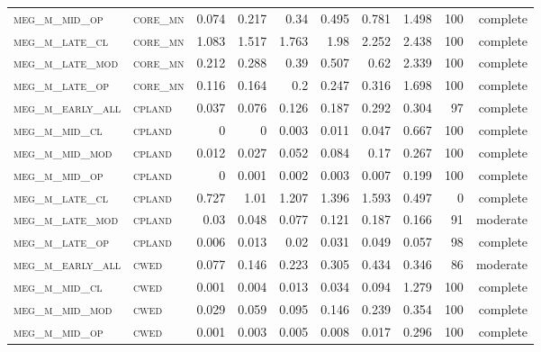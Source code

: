 \begin{landscape}
\begin{center}
\begin{footnotesize}
\begin{longtable}{llrrrrr|rrr}
\textsc{meg\_m\_mid\_op   } & \textsc{core\_mn  }   & 0.074    & 0.217    & 0.34     & 0.495    & 0.781    & 1.498    & 100 & complete \\
\textsc{meg\_m\_late\_cl  } & \textsc{core\_mn  }   & 1.083    & 1.517    & 1.763    & 1.98     & 2.252    & 2.438    & 100 & complete \\
\textsc{meg\_m\_late\_mod } & \textsc{core\_mn  }   & 0.212    & 0.288    & 0.39     & 0.507    & 0.62     & 2.339    & 100 & complete \\
\textsc{meg\_m\_late\_op  } & \textsc{core\_mn  }   & 0.116    & 0.164    & 0.2      & 0.247    & 0.316    & 1.698    & 100 & complete \\
\textsc{meg\_m\_early\_all} & \textsc{cpland    }   & 0.037    & 0.076    & 0.126    & 0.187    & 0.292    & 0.304    & 97  & complete \\
\textsc{meg\_m\_mid\_cl   } & \textsc{cpland    }   & 0        & 0        & 0.003    & 0.011    & 0.047    & 0.667    & 100 & complete \\
\textsc{meg\_m\_mid\_mod  } & \textsc{cpland    }   & 0.012    & 0.027    & 0.052    & 0.084    & 0.17     & 0.267    & 100 & complete \\
\textsc{meg\_m\_mid\_op   } & \textsc{cpland    }   & 0        & 0.001    & 0.002    & 0.003    & 0.007    & 0.199    & 100 & complete \\
\textsc{meg\_m\_late\_cl  } & \textsc{cpland    }   & 0.727    & 1.01     & 1.207    & 1.396    & 1.593    & 0.497    & 0   & complete \\
\textsc{meg\_m\_late\_mod } & \textsc{cpland    }   & 0.03     & 0.048    & 0.077    & 0.121    & 0.187    & 0.166    & 91  & moderate \\
\textsc{meg\_m\_late\_op  } & \textsc{cpland    }   & 0.006    & 0.013    & 0.02     & 0.031    & 0.049    & 0.057    & 98  & complete \\
\textsc{meg\_m\_early\_all} & \textsc{cwed      }   & 0.077    & 0.146    & 0.223    & 0.305    & 0.434    & 0.346    & 86  & moderate \\
\textsc{meg\_m\_mid\_cl   } & \textsc{cwed      }   & 0.001    & 0.004    & 0.013    & 0.034    & 0.094    & 1.279    & 100 & complete \\
\textsc{meg\_m\_mid\_mod  } & \textsc{cwed      }   & 0.029    & 0.059    & 0.095    & 0.146    & 0.239    & 0.354    & 100 & complete \\
\textsc{meg\_m\_mid\_op   } & \textsc{cwed      }   & 0.001    & 0.003    & 0.005    & 0.008    & 0.017    & 0.296    & 100 & complete \\

\end{longtable}
\end{footnotesize}
\end{center}
\end{landscape}
